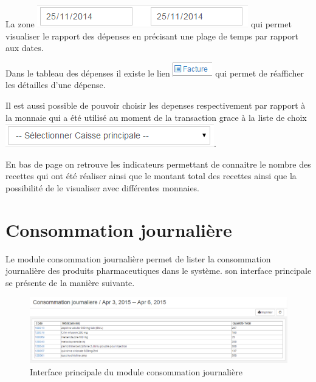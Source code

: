 \documentclass[12pt,a4paper]{report}
\begin{document}
La zone  \includegraphics[scale=0.7]{pic/PlageTimes.png} qui permet visualiser le rapport des dépenses en précisant une plage de temps par rapport aux dates.

Dans le tableau des dépenses il existe le lien \includegraphics[scale=0.7]{pic/FactureRePrint.png} qui permet de réafficher les détailles d'une dépense.

Il est aussi possible de pouvoir choisir les depenses respectivement par rapport à la monnaie qui a été utilisé au moment de la transaction grace à la liste de choix \includegraphics[scale=0.7]{pic/SelecPriCash.png}.

En bas de page on retrouve les indicateurs permettant de connaitre le nombre des recettes qui ont été réaliser ainsi que le montant total des recettes ainsi que la possibilité de le visualiser avec différentes monnaies. 

\newpage
\section{Consommation journalière}
Le module consommation journalière permet de lister la consommation journalière des produits pharmaceutiques dans le système.
son interface principale se présente de la manière suivante.

\begin{figure}[h]
\begin{center}
\includegraphics[width=14cm]{pic/ConsoJournProd.png}
\end{center}
\caption{Interface principale du module consommation journalière}
\label{Interface principale du module consommation journalière}
\end{figure}
\end{document}
